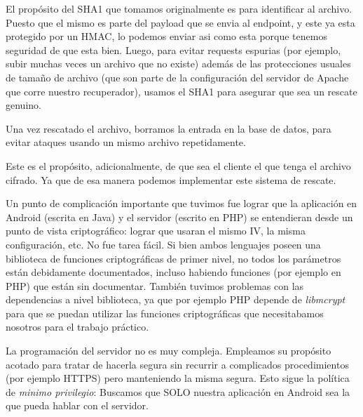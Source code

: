 El propósito del SHA1 que tomamos originalmente es para identificar al archivo. Puesto que el mismo es parte del payload que se envia al
endpoint, y este ya esta protegido por un HMAC, lo podemos enviar asi como esta porque tenemos seguridad de que esta bien. Luego, para evitar
requests espurias (por ejemplo, subir muchas veces un archivo que no existe) además de las protecciones usuales de tamaño de archivo (que son
parte de la configuración del servidor de Apache que corre nuestro recuperador), usamos el SHA1 para asegurar que sea un rescate genuino.

Una vez rescatado el archivo, borramos la entrada en la base de datos, para evitar ataques usando un mismo archivo repetidamente.

Este es el propósito, adicionalmente, de que sea el cliente el que tenga el archivo cifrado. Ya que de esa manera podemos implementar este
sistema de rescate.

Un punto de complicación importante que tuvimos fue lograr que la aplicación en Android (escrita en Java) y el servidor (escrito en PHP) se
entendieran desde un punto de vista criptográfico: lograr que usaran el mismo IV, la misma configuración, etc. No fue tarea fácil. Si bien
ambos lenguajes poseen una biblioteca de funciones criptográficas de primer nivel, no todos los parámetros están debidamente documentados,
incluso habiendo funciones (por ejemplo en PHP) que están sin documentar. También tuvimos problemas con las dependencias a nivel biblioteca,
ya que por ejemplo PHP depende de \textit{libmcrypt} para que se puedan utilizar las funciones criptográficas que necesitabamos nosotros para
el trabajo práctico.

La programación del servidor no es muy compleja. Empleamos su propósito acotado para tratar de hacerla segura sin recurrir a complicados 
procedimientos (por ejemplo HTTPS) pero manteniendo la misma segura. Esto sigue la política de \textit{minimo privilegio}: Buscamos que SOLO
nuestra aplicación en Android sea la que pueda hablar con el servidor.

%



